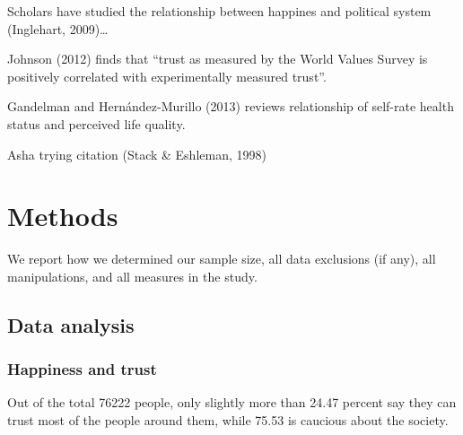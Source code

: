 \documentclass[man,floatsintext]{apa6}
\begin{document}
Scholars have studied the relationship between happines and political system (Inglehart, 2009)\ldots{}

Johnson (2012) finds that \enquote{trust as measured by the World Values Survey is positively correlated with experimentally measured trust}.

Gandelman and Hernández-Murillo (2013) reviews relationship of self-rate health status and perceived life quality.

Asha trying citation (Stack \& Eshleman, 1998)

\hypertarget{methods}{%
\section{Methods}\label{methods}}

We report how we determined our sample size, all data exclusions (if any), all manipulations, and all measures in the study.

\hypertarget{data-analysis}{%
\subsection{Data analysis}\label{data-analysis}}

\hypertarget{happiness-and-trust}{%
\subsubsection{Happiness and trust}\label{happiness-and-trust}}

Out of the total 76222 people, only slightly more than 24.47 percent say they can trust most of the people around them, while 75.53 is caucious about the society.
\end{document}
